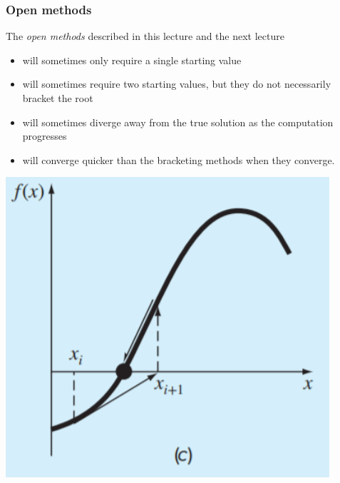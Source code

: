 \documentclass{if-beamer}
\begin{document}
\begin{frame}
\frametitle{Open methods}
\begin{minipage}{0.5\textwidth}
	The \textit{open methods} described in this lecture and the next lecture\\\vspace{7pt} 
	\begin{itemize}
		\item will sometimes only require a single starting value \\\vspace{2pt}
		\item will sometimes require two starting values, but they do not necessarily bracket the root \\\vspace{2pt}
		\item will sometimes diverge away from the true solution as the computation progresses \\\vspace{2pt}
		\item will converge quicker than the bracketing methods when they converge.
	\end{itemize}
\end{minipage} 
\begin{minipage}{0.5\textwidth}
	\centering
	\includegraphics[width = 0.9\textwidth]{figures/converging}
\end{minipage}
\end{frame}

	
\end{document}
